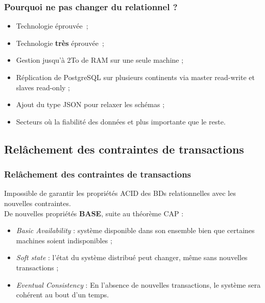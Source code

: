 	\begin{frame}
		\frametitle{Pourquoi ne pas changer du relationnel ?}

		\begin{itemize}
            \item Technologie éprouvée ;
            \item Technologie \textbf{très} éprouvée ;
        \end{itemize}

		\begin{itemize}
			\item Gestion jusqu'à 2To de RAM sur une seule machine ;
			\item Réplication de PostgreSQL sur plusieurs continents via master read-write et slaves read-only ;
			\item Ajout du type JSON pour relaxer les schémas ;
            \item Secteurs où la fiabilité des données et plus importante que le reste.
		\end{itemize}
	\end{frame}

	\subsection{Relâchement des contraintes de transactions}
	\begin{frame}
		\frametitle{Relâchement des contraintes de transactions}

		Impossible de garantir les propriétés ACID des BDs relationnelles avec les nouvelles contraintes.\\
		\vspace{10px}
		De nouvelles propriétés \textbf{BASE}, suite au théorème CAP :
		\begin{itemize}
			\item \textit{Basic Availability} : système disponible dans son ensemble bien que certaines machines soient indisponibles ;
			\item \textit{Soft state} : l'état du système distribué peut changer, même sans nouvelles transactions ;
			\item \textit{Eventual Consistency} : En l'absence de nouvelles transactions, le système sera cohérent au bout d'un temps.
		\end{itemize}

	\end{frame}

